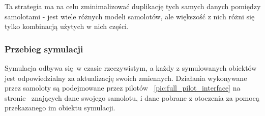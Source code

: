 \documentclass{article}
\newcommand*{\fullref}[1]{\figurename~\ref{#1} na stronie~\pageref{#1}}
\begin{document}
Ta strategia ma na celu zminimalizować duplikację tych samych danych pomiędzy samolotami
- jest wiele różnych modeli samolotów, ale większość z nich różni się tylko kombinacją
użytych w nich części.

\subsubsection{Przebieg symulacji}

Symulacja odbywa się w czasie rzeczywistym, a każdy z symulowanych obiektów jest
odpowiedzialny za aktualizację swoich zmiennych.
Działania wykonywane przez samoloty są podejmowane przez pilotów \fullref{pic:full_pilot_interface}
znających dane swojego samolotu, i dane pobrane z otoczenia za pomocą przekazanego im obiektu
symulacji.
\end{document}
